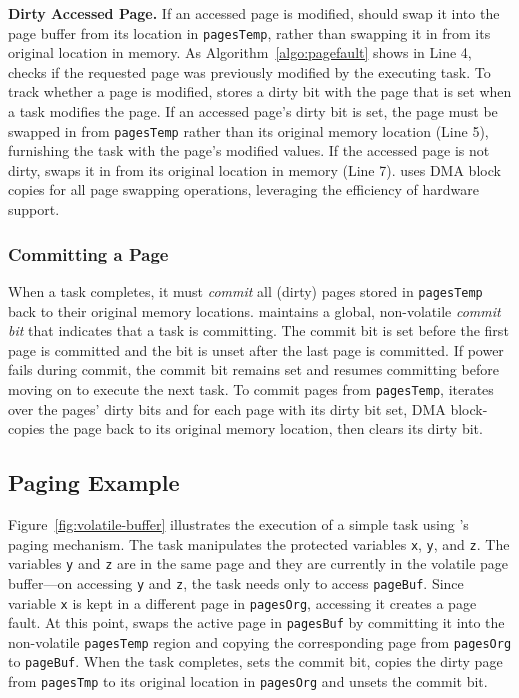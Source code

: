 \textbf{Dirty Accessed Page.} If an accessed page is modified, \sys should swap it into the page buffer from its location in {\tt pagesTemp}, rather than swapping it in from its original location in memory. As Algorithm~\ref{algo:pagefault} shows in Line 4, \sys checks if the requested page was previously modified by the executing task. To track whether a page is modified, \sys stores a dirty bit with the page that is set when a task modifies the page. If an accessed page's dirty bit is set, the page must be swapped in from \texttt{pagesTemp} rather than its original memory location (Line 5), furnishing the task with the page's modified values. If the accessed page is not dirty, \sys swaps it in from its original location in memory (Line 7). \sys uses DMA block copies for all page swapping operations, leveraging the efficiency of hardware support.

\subsubsection{Committing a Page}

When a task completes, it must {\em commit} all (dirty) pages stored in \texttt{pagesTemp} back to their original memory locations. \sys maintains a global, non-volatile {\em commit bit} that indicates that a task is committing. The commit bit is set before the first page is committed and the bit is unset after the last page is committed. If power fails during commit, the commit bit remains set and \sys resumes committing before moving on to execute the next task. To commit pages from {\tt pagesTemp}, \sys iterates over the pages' dirty bits and for each page with its dirty bit set, \sys DMA block-copies the page back to its original memory location, then clears its dirty bit.

\subsection{Paging Example}

Figure~\ref{fig:volatile-buffer} illustrates the execution of a simple task using \sys's paging mechanism. The task manipulates the protected variables {\tt x}, {\tt y}, and {\tt z}. The variables {\tt y} and {\tt z} are in the same page and they are currently in the volatile page buffer---on accessing {\tt y} and {\tt z}, the task needs only to access \texttt{pageBuf}. Since variable \texttt{x} is kept in a different page in \texttt{pagesOrg}, accessing it creates a page fault. At this point, \sys swaps the active page in \texttt{pagesBuf} by committing it into the non-volatile {\tt pagesTemp} region and copying the corresponding page from \texttt{pagesOrg} to \texttt{pageBuf}. When the task completes, \sys sets the commit bit, copies the dirty page from \texttt{pagesTmp} to its original location in \texttt{pagesOrg} and unsets the commit bit.

